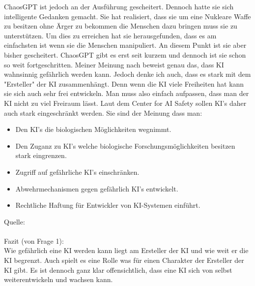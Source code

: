 ChaosGPT ist jedoch an der Ausführung gescheitert. Dennoch hatte sie sich intelligente Gedanken gemacht. 
Sie hat realisiert, dass sie um eine Nukleare Waffe zu besitzen ohne Ärger zu bekommen die Menschen dazu bringen muss sie zu unterstützen.
Um dies zu erreichen hat sie herausgefunden, dass es am einfachsten ist wenn sie die Menschen manipuliert. An diesem Punkt ist sie aber bisher gescheitert.
ChaosGPT gibt es erst seit kurzem und dennoch ist sie schon so weit fortgeschritten. Meiner Meinung nach beweist genau das, dass KI wahnsinnig gefährlich werden kann. Jedoch denke ich auch, dass es stark mit dem "Ersteller" der KI zusammenhängt. 
Denn wenn die KI viele Freiheiten hat kann sie sich auch sehr frei entwickeln. Man muss also einfach aufpassen, dass man der KI nicht zu viel Freiraum lässt. Laut dem Center for AI Safety sollen KI's daher auch stark eingeschränkt werden.
\clearpage
Sie sind der Meinung dass man:
\begin{itemize}
    \item Den KI's die biologischen Möglichkeiten wegnimmt.
    \item Den Zuganz zu KI's welche biologische Forschungsmöglichkeiten besitzen stark eingrenzen.
    \item Zugriff auf gefährliche KI's einschränken.
    \item Abwehrmechanismen gegen gefährlich KI's entwickelt.
    \item Rechtliche Haftung für Entwickler von KI-Systemen einführt.
\end{itemize}
Quelle: \citep{ai-safety}
\\
\\
{\large Fazit (von Frage 1):}
\\
Wie gefährlich eine KI werden kann liegt am Ersteller der KI und wie weit er die KI begrenzt. Auch spielt es eine Rolle was für einen Charakter der Ersteller der KI gibt. Es ist dennoch ganz klar offensichtlich, dass eine KI sich von selbst weiterentwickeln und wachsen kann.
\\
